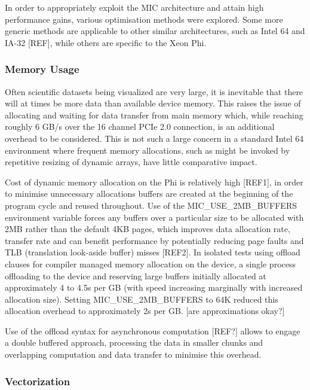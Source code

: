 \documentclass{easychair}
\begin{document}
In order to appropriately exploit the MIC architecture and attain high performance gains, various optimisation methods 
were explored. Some more generic methods are applicable to other similar architectures, such as Intel 64 and IA-32 [REF], while 
others are specific to the Xeon Phi. 

\subsubsection{Memory Usage}
\label{sect:memusage}

Often scientific datasets being visualized are very large, it is inevitable that there will at times be more data than 
available device memory. This raises the issue of allocating and waiting for data transfer from main memory which, 
while reaching roughly 6 GB/s over the 16 channel PCIe 2.0 connection, is an additional overhead to be considered.
This is not such a large concern in a standard Intel 64 environment where frequent memory allocations, such as might be 
invoked by repetitive resizing of dynamic arrays, have little comparative impact.

Cost of dynamic memory allocation on the Phi is relatively high [REF1], in order to minimise unnecessary allocations 
buffers are created at the beginning of the program cycle and reused throughout. Use of the MIC\_USE\_2MB\_BUFFERS 
environment variable forces any buffers over a particular size to be allocated with 2MB rather than the default 4KB 
pages, which improves data allocation rate, transfer rate and can benefit performance by potentially reducing page 
faults and TLB (translation look-aside buffer) misses [REF2]. In isolated tests using offload clauses for compiler 
managed memory allocation on the device, a single process offloading to the device and reserving large buffers 
initially allocated at approximately 4 to 4.5s per GB (with speed increasing marginally with increased allocation size). 
Setting MIC\_USE\_2MB\_BUFFERS to 64K reduced this allocation overhead to approximately 2s per GB. [are approximations okay?]

Use of the offload syntax for asynchronous computation [REF?] allows to engage a double buffered approach, 
processing the data in smaller chunks and overlapping computation and data transfer to minimise this overhead.

\subsubsection{Vectorization}
\label{sect:vectorization}
\end{document}

